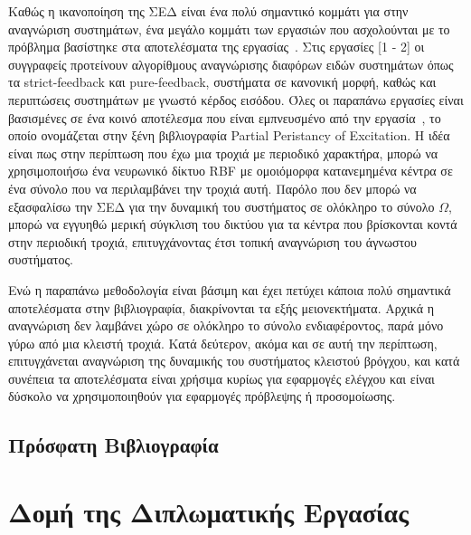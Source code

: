 Καθώς η ικανοποίηση της ΣΕΔ είναι ένα πολύ σημαντικό κομμάτι για στην αναγνώριση συστημάτων, ένα μεγάλο κομμάτι των εργασιών που ασχολούνται με το πρόβλημα βασίστηκε στα αποτελέσματα της εργασίας~\cite{kurdila1995persistency}. Στις εργασίες [1 - 2] οι συγγραφείς προτείνουν αλγορίθμους αναγνώρισης διαφόρων ειδών συστημάτων όπως τα strict-feedback και pure-feedback, συστήματα σε κανονική μορφή, καθώς και περιπτώσεις συστημάτων με γνωστό κέρδος εισόδου. Όλες οι παραπάνω εργασίες είναι βασισμένες σε ένα κοινό αποτέλεσμα που είναι εμπνευσμένο από την εργασία~\cite{kurdila1995persistency}, το οποίο ονομάζεται στην ξένη βιβλιογραφία Partial Peristancy of Excitation. Η ιδέα είναι πως στην περίπτωση που έχω μια τροχιά με περιοδικό χαρακτήρα, μπορώ να χρησιμοποιήσω ένα νευρωνικό δίκτυο RBF με ομοιόμορφα κατανεμημένα κέντρα σε ένα σύνολο που να περιλαμβάνει την τροχιά αυτή. Παρόλο που δεν μπορώ να εξασφαλίσω την ΣΕΔ για την δυναμική του συστήματος σε ολόκληρο το σύνολο $\Omega$, μπορώ να εγγυηθώ μερική σύγκλιση του δικτύου για τα κέντρα που βρίσκονται κοντά στην περιοδική τροχιά, επιτυγχάνοντας έτσι τοπική αναγνώριση του άγνωστου συστήματος.

Ενώ η παραπάνω μεθοδολογία είναι βάσιμη και έχει πετύχει κάποια πολύ σημαντικά αποτελέσματα στην βιβλιογραφία, διακρίνονται τα εξής μειονεκτήματα. Αρχικά η αναγνώριση δεν λαμβάνει χώρο σε ολόκληρο το σύνολο ενδιαφέροντος, παρά μόνο γύρω από μια κλειστή τροχιά. Κατά δεύτερον, ακόμα και σε αυτή την περίπτωση, επιτυγχάνεται αναγνώριση της δυναμικής του συστήματος κλειστού βρόγχου, και κατά συνέπεια τα αποτελέσματα είναι χρήσιμα κυρίως για εφαρμογές ελέγχου και είναι δύσκολο να χρησιμοποιηθούν για εφαρμογές πρόβλεψης ή προσομοίωσης.

\subsection{Πρόσφατη Βιβλιογραφία}

\section{Δομή της Διπλωματικής Εργασίας}




